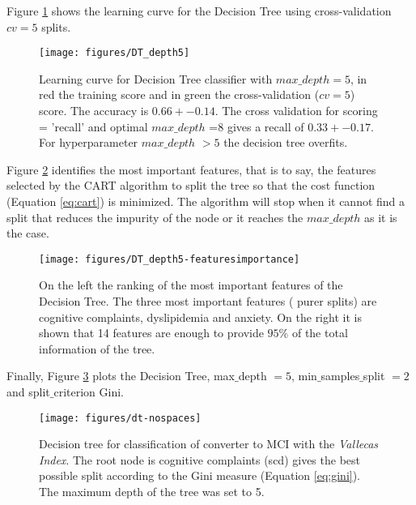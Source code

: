 \documentclass[11pt]{article}
\theoremstyle{definition}
\theoremstyle{remark}
\begin{document}
Figure \ref{fig:dt-md5-learning} shows the learning curve for the Decision Tree using cross-validation $cv=5$ splits. 
\begin{figure}[H]
        \centering
        \texttt{[image: figures/DT\_depth5]}
        \caption{Learning curve for Decision Tree classifier with $max\_depth=5$, in red the training score and in green the cross-validation ($cv=5$) score. The accuracy is $0.66+ -0.14$. The cross validation for scoring = 'recall' and optimal $max\_depth$ =8 gives a recall of $0.33+ -0.17$. For hyperparameter $max\_depth$ $>5$ the decision tree overfits. 
        } \label{fig:dt-md5-learning}
\end{figure}

Figure \ref{fig:dt-md5-features} identifies the most important features, that is to say, the features selected by the CART algorithm to split the tree so that the cost function (Equation \ref{eq:cart}) is minimized. The algorithm will stop when it cannot find a split that reduces the impurity of the node or it reaches the $max\_depth$ as it is the case.
\begin{figure}[H]
        \centering
        \texttt{[image: figures/DT\_depth5-featuresimportance]}
        \caption{On the left the ranking of the most important features of the Decision Tree. The three most important features ( purer splits) are cognitive complaints, dyslipidemia and anxiety. On the right it is shown that 14 features are enough to provide $95\%$ of the total information of the tree.
        } \label{fig:dt-md5-features}
\end{figure}

Finally, Figure \ref{fig:dt-md5-dot} plots the Decision Tree, max$\_$depth $=5$, min$\_$samples$\_$split $=2$ and split$\_$criterion Gini.
\begin{figure}[H]
        \centering
        \texttt{[image: figures/dt-nospaces]}%
        \caption{Decision tree for classification of converter to MCI with the \emph{Vallecas Index}. The root node is cognitive complaints (scd) gives the best possible split according to the Gini measure (Equation \ref{eq:gini}). The maximum depth of the tree was set to 5.
        } \label{fig:dt-md5-dot}
\end{figure}
\end{document}
